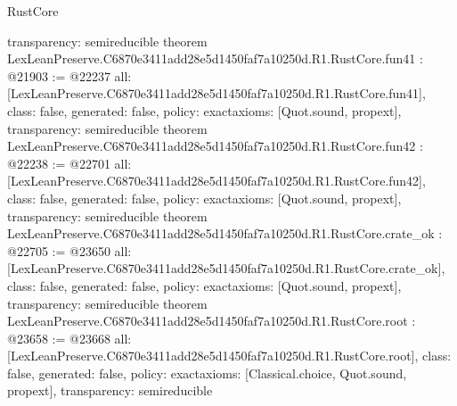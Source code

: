 \begin{lexlean}{RustCore}
\begin{coremodule}
{  transparency: semireducible
}
theorem LexLeanPreserve.C6870e3411add28e5d1450faf7a10250d.R1.RustCore.fun41 : @21903 := @22237 {
  all: [LexLeanPreserve.C6870e3411add28e5d1450faf7a10250d.R1.RustCore.fun41],
  class: false,
  generated: false,
  policy: exact{axioms: [Quot.sound, propext]},
  transparency: semireducible
}
theorem LexLeanPreserve.C6870e3411add28e5d1450faf7a10250d.R1.RustCore.fun42 : @22238 := @22701 {
  all: [LexLeanPreserve.C6870e3411add28e5d1450faf7a10250d.R1.RustCore.fun42],
  class: false,
  generated: false,
  policy: exact{axioms: [Quot.sound, propext]},
  transparency: semireducible
}
theorem LexLeanPreserve.C6870e3411add28e5d1450faf7a10250d.R1.RustCore.crate_ok : @22705 := @23650 {
  all: [LexLeanPreserve.C6870e3411add28e5d1450faf7a10250d.R1.RustCore.crate_ok],
  class: false,
  generated: false,
  policy: exact{axioms: [Quot.sound, propext]},
  transparency: semireducible
}
theorem LexLeanPreserve.C6870e3411add28e5d1450faf7a10250d.R1.RustCore.root : @23658 := @23668 {
  all: [LexLeanPreserve.C6870e3411add28e5d1450faf7a10250d.R1.RustCore.root],
  class: false,
  generated: false,
  policy: exact{axioms: [Classical.choice, Quot.sound, propext]},
  transparency: semireducible
}


\end{coremodule}
\end{lexlean}
